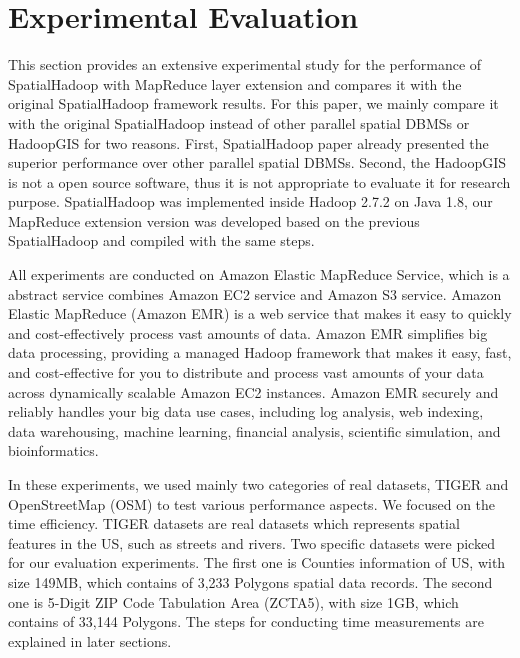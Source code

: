 \section{Experimental Evaluation}
\label{sec:experiments}



This section provides an extensive experimental study for the performance of SpatialHadoop with MapReduce layer extension and compares it with the original SpatialHadoop framework results. For this paper, we mainly compare it with the original SpatialHadoop instead of other parallel spatial DBMSs or HadoopGIS for two reasons. First, SpatialHadoop \cite{eldawy2015spatialhadoop} paper already presented the superior performance over other parallel spatial DBMSs. Second, the HadoopGIS is not a open source software, thus it is not appropriate to evaluate it for research purpose. SpatialHadoop was implemented inside Hadoop 2.7.2 on Java 1.8, our MapReduce extension version was developed based on the previous SpatialHadoop and compiled with the same steps. 

All experiments are conducted on Amazon Elastic MapReduce Service, which is a abstract service combines Amazon EC2 service and Amazon S3 service. Amazon Elastic MapReduce (Amazon EMR) is a web service that makes it easy to quickly and cost-effectively process vast amounts of data. Amazon EMR simplifies big data processing, providing a managed Hadoop framework that makes it easy, fast, and cost-effective for you to distribute and process vast amounts of your data across dynamically scalable Amazon EC2 instances. Amazon EMR securely and reliably handles your big data use cases, including log analysis, web indexing, data warehousing, machine learning, financial analysis, scientific simulation, and bioinformatics.


In these experiments, we used mainly two categories of real datasets, TIGER and OpenStreetMap (OSM) to test various performance aspects. We focused on the time efficiency. TIGER datasets are real datasets which represents spatial features in the US, such as streets and rivers. Two specific datasets were picked for our evaluation experiments. The first one is Counties information of US, with size 149MB, which contains of 3,233 Polygons spatial data records. The second one is 5-Digit ZIP Code Tabulation Area (ZCTA5), with size 1GB, which contains of 33,144 Polygons. The steps for conducting time measurements are explained in later sections.



